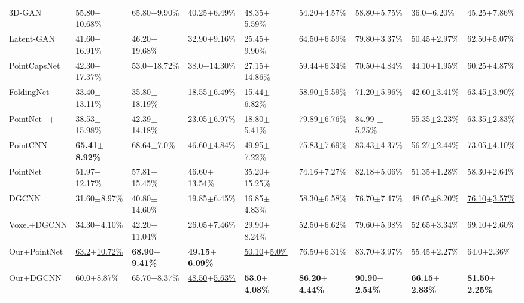 \documentclass{article}
\begin{document}
\begin{table}[tbp]
\begin{tabular}{lllllllll}
3D-GAN &  55.80$\pm$10.68\% &  65.80$\pm$9.90\% & 40.25$\pm$6.49\% & 48.35$\pm$5.59\% &  54.20$\pm$4.57\% & 58.80$\pm$5.75\% & 36.0$\pm$6.20\%&45.25$\pm$7.86\%\\
		Latent-GAN & 41.60$\pm$16.91\%&  46.20$\pm$19.68\% & 32.90$\pm$9.16\% & 25.45$\pm$9.90\% &  64.50$\pm$6.59\% & 79.80$\pm$3.37\% &50.45$\pm$2.97\% &62.50$\pm$5.07\% \\
		PointCapsNet & 42.30$\pm$17.37\% &  53.0$\pm$18.72\% &38.0$\pm$14.30\% & 27.15$\pm$14.86\%  &  59.44$\pm$6.34\% &  70.50$\pm$4.84\% &44.10$\pm$1.95\%&60.25$\pm$4.87\%\\
		FoldingNet & 33.40$\pm$13.11\% &  35.80$\pm$18.19\% & 18.55$\pm$6.49\% & 15.44$\pm$6.82\% & 58.90$\pm$5.59\% &  71.20$\pm$5.96\% &42.60$\pm$3.41\%&63.45$\pm$3.90\%\\
		PointNet++ & 38.53$\pm$15.98\% & 42.39$\pm$14.18\%&  23.05$\pm$6.97\% & 18.80$\pm$5.41\% & \underline{79.89$\pm$6.76\%} & \underline{84.99 $\pm$5.25\%}  & 55.35$\pm$2.23\% & 63.35$\pm$2.83\% \\
		PointCNN & \textbf{65.41$\pm$8.92\%} &  \underline{68.64$\pm$7.0\%} & 46.60$\pm$4.84\% &49.95$\pm$7.22\% & 75.83$\pm$7.69\% & 83.43$\pm$4.37\%&\underline{56.27$\pm$2.44\%}&73.05$\pm$4.10\% \\
		PointNet & 51.97$\pm$12.17\% & 57.81$\pm$15.45\% & 46.60$\pm$13.54\% & 35.20$\pm$15.25\% & 74.16$\pm$7.27\% & 82.18$\pm$5.06\% & 51.35$\pm$1.28\% & 58.30$\pm$2.64\% \\
		DGCNN & 31.60$\pm$8.97\%& 40.80$\pm$14.60\%& 19.85$\pm$6.45\%& 16.85$\pm$4.83\%& 58.30$\pm$6.58\%& 76.70$\pm$7.47\%& 48.05$\pm$8.20\%&\underline{76.10$\pm$3.57\%}\\
		Voxel+DGCNN & 34.30$\pm$4.10\% & 42.20$\pm$11.04\%& 26.05$\pm$7.46\%& 29.90$\pm$8.24\%& 52.50$\pm$6.62\%& 79.60$\pm$5.98\%&52.65$\pm$3.34\%&69.10$\pm$2.60\%\\
		\midrule
		
		Our+PointNet & \underline{63.2$\pm$10.72\%} & \textbf{68.90$\pm$9.41\%} &\textbf{49.15$\pm$6.09\%} & \underline{50.10$\pm$5.0\%} &76.50$\pm$6.31\% &83.70$\pm$3.97\% & 55.45$\pm$2.27\% & 64.0$\pm$2.36\% \\
		Our+DGCNN & 60.0$\pm$8.87\% &  65.70$\pm$8.37\% &  \underline{48.50$\pm$5.63\%}& \textbf{53.0$\pm$4.08\%} &\textbf{86.20$\pm$4.44\%} &\textbf{90.90$\pm$2.54\%} & \textbf{66.15$\pm$2.83\%} & \textbf{81.50$\pm$2.25\%}\\
		\bottomrule
	\end{tabular}
\end{table}
\end{document}

